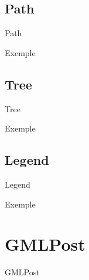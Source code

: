 \documentclass{beamer}
\begin{document}
\subsection{Path}
\begin{frame}{Path}
\end{frame}

\begin{frame}{Exemple}
\end{frame}

\subsection{Tree}
\begin{frame}{Tree}
\end{frame}

\begin{frame}{Exemple}
\end{frame}

\subsection{Legend}
\begin{frame}{Legend}
\end{frame}

\begin{frame}{Exemple}
\end{frame}

\section{GMLPost}
\begin{frame}{GMLPost}
\end{frame}





\end{document}
